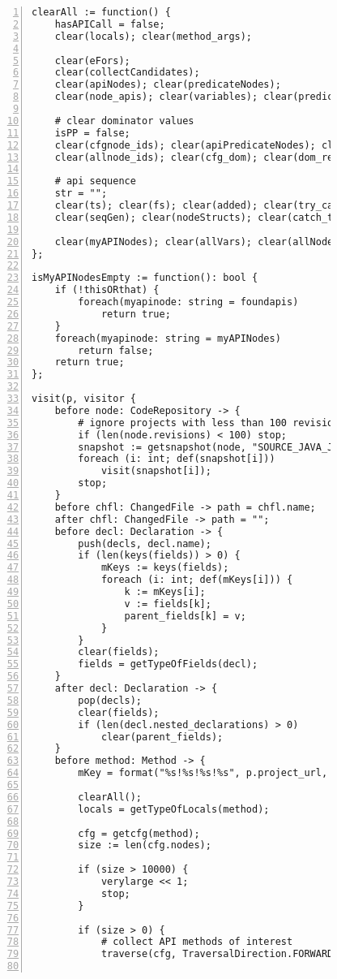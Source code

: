 \begin{figure}[ht!]
\begin{lstlisting}[numbers=left, tabsize=4, escapechar=@, caption={API Usage Mining Analysis},label={lst:aun-code}, lastline = 10]
clearAll := function() {
    hasAPICall = false;
    clear(locals); clear(method_args);
	    
	clear(eFors);
    clear(collectCandidates);
    clear(apiNodes); clear(predicateNodes); 
    clear(node_apis); clear(variables); clear(predicates);
	    
	# clear dominator values
	isPP = false;
    clear(cfgnode_ids); clear(apiPredicateNodes); clear(exits); clear(exitsT);
    clear(allnode_ids); clear(cfg_dom); clear(dom_result); clear(dom_more); clear(terminals);
	    
    # api sequence
    str = "";
    clear(ts); clear(fs); clear(added); clear(try_catch_finally); clear(catch_counts);
    clear(seqGen); clear(nodeStructs); clear(catch_types);
    
    clear(myAPINodes); clear(allVars); clear(allNodeIds); clear(hops); clear(foundapis);
};

isMyAPINodesEmpty := function(): bool {
    if (!thisORthat) {
        foreach(myapinode: string = foundapis)
            return true;
    }
    foreach(myapinode: string = myAPINodes)    
        return false;
    return true;
};

visit(p, visitor {
	before node: CodeRepository -> {
	    # ignore projects with less than 100 revisions
        if (len(node.revisions) < 100) stop;
		snapshot := getsnapshot(node, "SOURCE_JAVA_JLS");
		foreach (i: int; def(snapshot[i]))
			visit(snapshot[i]);
		stop;
	}
	before chfl: ChangedFile -> path = chfl.name;
	after chfl: ChangedFile -> path = "";
	before decl: Declaration -> {
	    push(decls, decl.name);
	    if (len(keys(fields)) > 0) {
	        mKeys := keys(fields);    
	        foreach (i: int; def(mKeys[i])) {
	        	k := mKeys[i];
	        	v := fields[k];
	            parent_fields[k] = v;
	        }
	    }
	    clear(fields);
	    fields = getTypeOfFields(decl);
	}
    after decl: Declaration -> {
        pop(decls);
        clear(fields);
        if (len(decl.nested_declarations) > 0)
            clear(parent_fields);
    }
	before method: Method -> {
	    mKey = format("%s!%s!%s!%s", p.project_url, path, peek(decls), method.name);
	    
        clearAll();
        locals = getTypeOfLocals(method);

	    cfg = getcfg(method);
	    size := len(cfg.nodes);
	    
	    if (size > 10000) {
		    verylarge << 1;
		    stop;
		}
		
		if (size > 0) {
		    # collect API methods of interest
		    traverse(cfg, TraversalDirection.FORWARD, TraversalKind.SHALLOW_ITERATIVE, collectCandidates);    
            

\end{lstlisting}
\end{figure}

